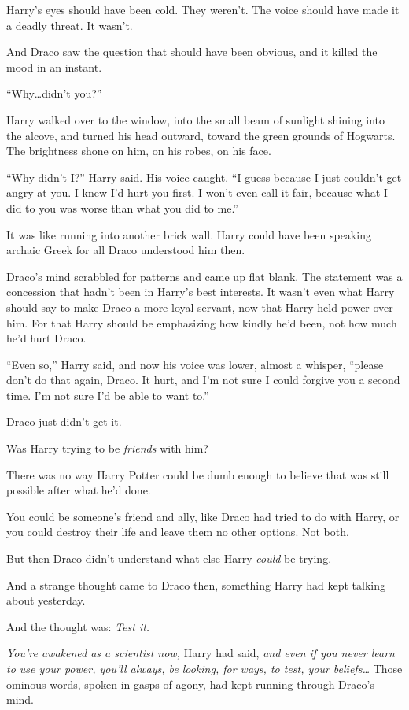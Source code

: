 Harry’s eyes should have been cold. They weren’t. The voice should have made it a deadly threat. It wasn’t.

And Draco saw the question that should have been obvious, and it killed the mood in an instant.

“Why…didn’t you?”

Harry walked over to the window, into the small beam of sunlight shining into the alcove, and turned his head outward, toward the green grounds of Hogwarts. The brightness shone on him, on his robes, on his face.

“Why didn’t I?” Harry said. His voice caught. “I guess because I just couldn’t get angry at you. I knew I’d hurt you first. I won’t even call it fair, because what I did to you was worse than what you did to me.”

It was like running into another brick wall. Harry could have been speaking archaic Greek for all Draco understood him then.

Draco’s mind scrabbled for patterns and came up flat blank. The statement was a concession that hadn’t been in Harry’s best interests. It wasn’t even what Harry should say to make Draco a more loyal servant, now that Harry held power over him. For that Harry should be emphasizing how kindly he’d been, not how much he’d hurt Draco.

“Even so,” Harry said, and now his voice was lower, almost a whisper, “please don’t do that again, Draco. It hurt, and I’m not sure I could forgive you a second time. I’m not sure I’d be able to want to.”

Draco just didn’t get it.

Was Harry trying to be \emph{friends} with him?

There was no way Harry Potter could be dumb enough to believe that was still possible after what he’d done.

You could be someone’s friend and ally, like Draco had tried to do with Harry, or you could destroy their life and leave them no other options. Not both.

But then Draco didn’t understand what else Harry \emph{could} be trying.

And a strange thought came to Draco then, something Harry had kept talking about yesterday.

And the thought was: \emph{Test it.}

\emph{You’re awakened as a scientist now,} Harry had said, \emph{and even if you never learn to use your power, you’ll always, be looking, for ways, to test, your beliefs…} Those ominous words, spoken in gasps of agony, had kept running through Draco’s mind.

